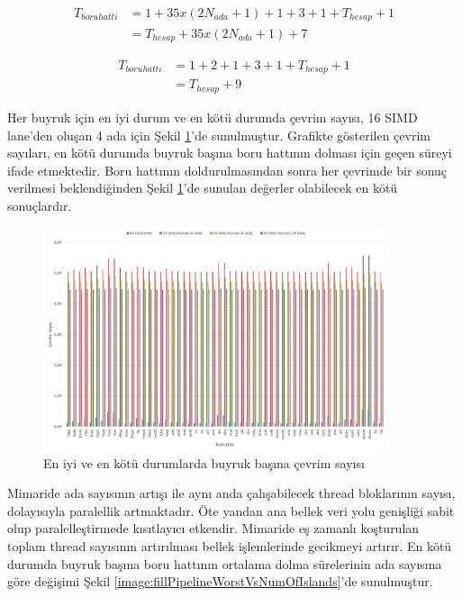 \begin{align} \label{equation:pipelineCycleEstimationWorstCase}
	T_{boru hatti} 	&= 1 + 35x(2N_{ada} + 1) + 1 + 3 + 1 + T_{hesap} + 1 \\
									&= T_{hesap} + 35 x (2N_{ada}+1) + 7
\end{align}

\begin{align} \label{equation:pipelineCycleEstimationBestCase}
	T_{boru hattı}  &= 1 + 2 + 1 + 3 + 1 + T_{hesap} + 1 \\
									&= T_{hesap} + 9
\end{align}

Her buyruk için en iyi durum ve en kötü durumda çevrim sayısı, 16 SIMD lane'den oluşan 4 ada için Şekil \ref{image:fillPipelineBestWorst}'de sunulmuştur. Grafikte gösterilen çevrim sayıları, en kötü durumda buyruk başına boru hattının dolması için geçen süreyi ifade etmektedir. Boru hattının doldurulmasından sonra her çevrimde bir sonuç verilmesi beklendiğinden Şekil \ref{image:fillPipelineBestWorst}'de sunulan değerler olabilecek en kötü sonuçlardır.\par

\begin{figure}[ht] \label{image:fillPipelineBestWorst}
\centering
\shorthandoff{=}
\includegraphics[width=0.9\textwidth]{gorsel/fillPipelineBestWorst.png}
\shorthandoff{=}
\caption{En iyi ve en kötü durumlarda buyruk başına çevrim sayısı}
\end{figure}

Mimaride ada sayısının artışı ile aynı anda çalışabilecek thread bloklarının sayısı, dolayısıyla paralellik artmaktadır. Öte yandan ana bellek veri yolu genişliği sabit olup paralelleştirmede kısıtlayıcı etkendir. Mimaride eş zamanlı koşturulan toplam thread sayısının artırılması bellek işlemlerinde gecikmeyi artırır. En kötü durumda buyruk başına boru hattının ortalama dolma sürelerinin ada sayısına göre değişimi Şekil \ref{image:fillPipelineWorstVsNumOfIslands}'de sunulmuştur.\par

